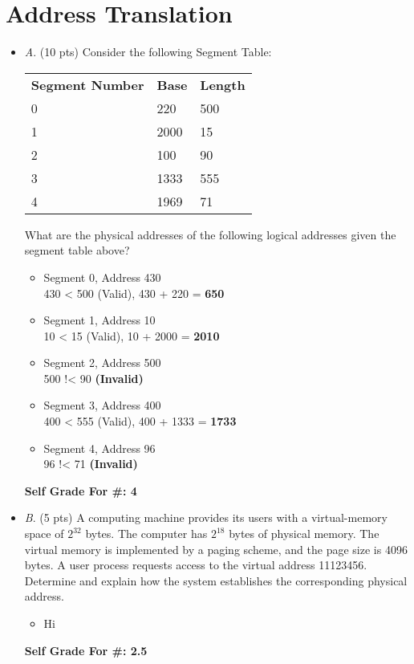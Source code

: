 \documentclass[conference]{IEEEtran}
\begin{document}
\section{Address Translation}
\begin{itemize}
	\item \textit{A}. (10 pts) Consider the following Segment Table:
		\begin{table}[H]
			\centering
			\begin{tabular}{lll}
				\textbf{Segment Number} & \textbf{Base} & \textbf{Length} \\
				0 & 220 & 500 \\
				1 & 2000 & 15 \\
				2 & 100 & 90 \\
				3 & 1333 & 555 \\
				4 & 1969 & 71
			\end{tabular}
		\end{table}
	
	What are the physical addresses of the following logical addresses given the segment table
	above?
	\begin{itemize} 
		\item {Segment 0, Address 430} \\	
		430 < 500 (Valid), 430 + 220 = \textbf{650}
		\item {Segment 1, Address 10} \\
		10 < 15 (Valid), 10 + 2000 = \textbf{2010} 
		\item {Segment 2, Address 500} \\
		500 !< 90 \textbf{(Invalid)} 
		\item {Segment 3, Address 400} \\
		400 < 555 (Valid), 400 + 1333 = \textbf{1733}
		\item {Segment 4, Address 96} \\
		96 !< 71 \textbf{(Invalid)}
	\end{itemize} 

\begin{center}
\textbf{Self Grade For \#: 4}
\end{center}

\end{itemize}
\begin{itemize}
	\item \textit{B}. (5 pts) A computing machine provides its users with a virtual-memory space of $2^{32}$ bytes.
	The computer has $2^{18}$ bytes of physical memory. The virtual memory is implemented by a
	paging scheme, and the page size is 4096 bytes. A user process requests access to the virtual
	address 11123456. Determine and explain how the system establishes the corresponding physical
	address.
	\begin{itemize} 
		\item Hi
	\end{itemize}

\begin{center}
\textbf{Self Grade For \#: 2.5}
\end{center}
\end{itemize}
\end{document}
